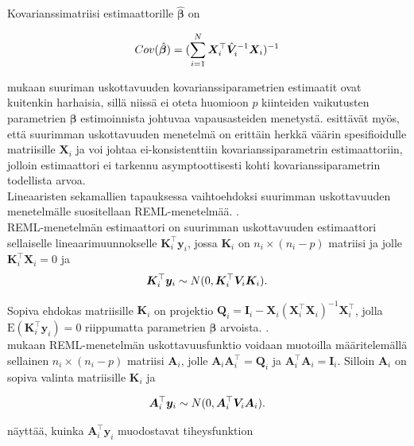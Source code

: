 \documentclass[finnish]{docopts}
\begin{document}
Kovarianssimatriisi estimaattorille $\hat{\bm{\beta}}$ on

$$
Cov(\hat{\bm{\beta}}) = (\sum\limits_{i=1}^{N} \bm{X}_{i}^\top \hat{\bm{V}}_i^{-1} \bm{X}_{i})^{-1} \\
$$

\cite{west14} mukaan suuriman uskottavuuden kovarianssiparametrien estimaatit ovat kuitenkin harhaisia, sillä niissä ei oteta huomioon $p$ kiinteiden vaikutusten parametrien $\bm{\beta}$ estimoinnista johtuvaa vapausasteiden menetystä. \cite{diggle13} esittävät myös, että suurimman uskottavuuden menetelmä on erittäin herkkä väärin spesifioidulle matriisille $\bm{X}_{i}$ ja voi johtaa ei-konsistenttiin kovarianssiparametrin estimaattoriin, jolloin estimaattori ei tarkennu asymptoottisesti kohti kovarianssiparametrin todellista arvoa.\\

Lineaaristen sekamallien tapauksessa vaihtoehdoksi suurimman uskottavuuden menetelmälle suositellaan REML-menetelmää. \citep{diggle13, pinheiro00, verbeke00}.\\

REML-menetelmän estimaattori on suurimman uskottavuuden estimaattori sellaiselle lineaarimuunnokselle $\bm{K}_{i}^\top \bm{y}_i$, jossa $\bm{K}_i$ on $n_{i} \times (n_{i} - p)$ matriisi ja jolle $\bm{K}_{i}^\top \bm{X}_i = 0$ ja 
$$
\bm{K}_{i}^\top \bm{y}_i \sim N(0, \bm{K}_{i}^\top \bm{V}_i \bm{K}_{i}).\\
$$


Sopiva ehdokas matriisille $\bm{K}_{i}$ on projektio $\bm{Q}_i = \bm{I}_i - \bm{X}_i(\bm{X}_i^\top \bm{X}_i)^{-1} \bm{X}_i^\top$, jolla $\text{E}(\bm{K}_{i}^\top \bm{y}_i) = 0$ riippumatta parametrien $\bm{\beta}$ arvoista. \citep{diggle13}. \\

\cite{nissinen09} mukaan REML-menetelmän uskottavuusfunktio voidaan muotoilla määritelemällä sellainen $n_i \times (n_i - p)$ matriisi $\bm{A}_i$, jolle $\bm{A}_i \bm{A}_i^\top = \bm{Q}_i$ ja $\bm{A}_{i}^\top \bm{A}_i = \bm{I}_i$. Silloin $\bm{A}_i$ on sopiva valinta matriisille $\bm{K}_i$ ja 

$$
\bm{A}_{i}^\top \bm{y}_i \sim N(0, \bm{A}_{i}^\top \bm{V}_i \bm{A}_{i}).\\
$$

\cite{nissinen09} näyttää, kuinka $\bm{A}_{i}^\top \bm{y}_i$ muodostavat tiheysfunktion
\end{document}
